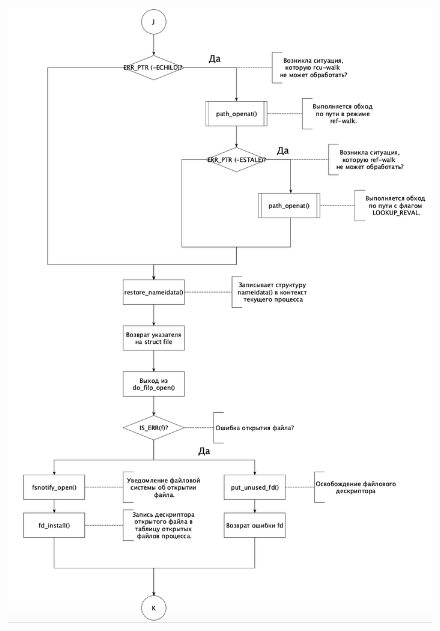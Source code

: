 \documentclass[a4paper,12pt]{article}
\begin{document}
	\begin{figure}[h!]
		\begin{center}
			{\includegraphics[scale = 0.8]{7.png}}
			\label{7}
		\end{center}
	\end{figure}
	
\end{document}

